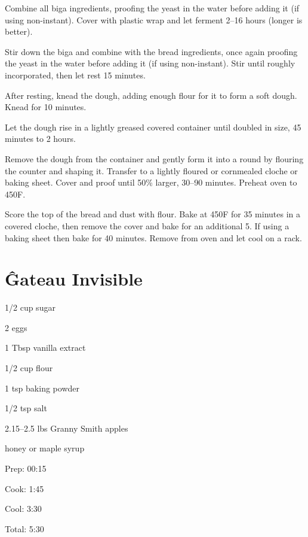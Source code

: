 \documentclass[oneside]{book}  %
\def\thisrecipe{}  %
\newcommand{\recipe}[1]{\section{#1}\def\thisrecipe{: #1}} %
\newcommand{\itemNL}{\item[] \hspace{-\labelsep}}  %
\newcommand{\degF}{\textdegree F\xspace}
\begin{document}
\begin{directions}
  \item Combine all biga ingredients, proofing the yeast in the water before
  adding it (if using non-instant). Cover with plastic wrap and let ferment
  2--16 hours (longer is better).

  \item Stir down the biga and combine with the bread ingredients, once again
  proofing the yeast in the water before adding it (if using non-instant). Stir
  until roughly incorporated, then let rest 15 minutes.

  \item After resting, knead the dough, adding enough flour for it to form a
  soft dough. Knead for 10 minutes.

  \item Let the dough rise in a lightly greased covered container until doubled
  in size, 45 minutes to 2 hours.

  \item Remove the dough from the container and gently form it into a round by
  flouring the counter and shaping it. Transfer to a lightly floured or
  cornmealed cloche or baking sheet. Cover and proof until 50\% larger, 30--90
  minutes. Preheat oven to 450\degF.

  \item Score the top of the bread and dust with flour. Bake at 450\degF for 35
  minutes in a covered cloche, then remove the cover and bake for an additional
  5. If using a baking sheet then bake for 40 minutes. Remove from oven and let
  cool on a rack.
\end{directions}
\recipe{\^{G}ateau Invisible} \label{recipe:gateau_invisible} %

\begin{IT}
  \begin{ingredients}
    \item[1/2 cup] sugar
    \item[2] eggs
    \item[1 Tbsp] vanilla extract
    \item[1/2 cup] flour
    \item[1 tsp] baking powder
    \item[1/2 tsp] salt
    \item[2.15--2.5 lbs] Granny Smith apples
    \itemNL honey or maple syrup
  \end{ingredients}

  \switchcolumn

  \begin{timeline}
    \item[Prep:]  00:15
    \item[Cook:]  1:45
    \item[Cool:]  3:30
    \item[Total:] 5:30
  \end{timeline}
\end{IT}
\end{document}
